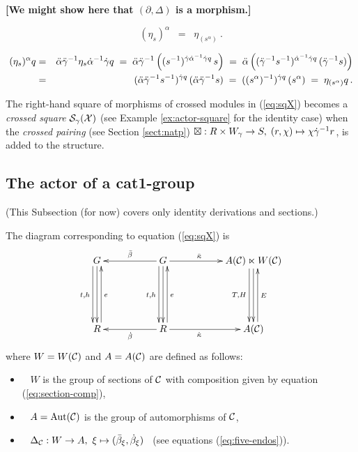 \vspace{3mm}
\noindent
{\bf [We might show here that $(\partial,\Delta)$ is a morphism.]}
\vspace{3mm}

\begin{lem}
$$
(\eta_s)^{\alpha} \;\;=\;\; \eta_{(s^{\alpha})}~.
$$
\end{lem}
\begin{pf} 
\begin{eqnarray*}
(\eta_s)^{\alpha}q 
  & = &  \ddot{\alpha} \ddot{\gamma}^{-1} \eta_s \dot{\alpha}^{-1} \dot{\gamma} q  
  \;=\;  \ddot{\alpha} \ddot{\gamma}^{-1} 
           \left( (s^{-1})^{\dot{\gamma}\dot{\alpha}^{-1}\dot{\gamma} q}\,s \right) 
  \;=\;  \ddot{\alpha}\left( (\ddot{\gamma}^{-1}s^{-1})^{\dot{\alpha}^{-1}\dot{\gamma} q}\,(\ddot{\gamma}^{-1}s)\right) \\ 
  & = &  (\ddot{\alpha} \ddot{\gamma}^{-1} s^{-1})^{\dot{\gamma} q}\,(\ddot{\alpha} \ddot{\gamma}^{-1}s)  
  \;=\;  ((s^{\alpha})^{-1})^{\dot{\gamma} q}\,(s^{\alpha}) 
  \;=\;  \eta_{(s^{\alpha})}q \,. 
\end{eqnarray*}
\end{pf}

\bigskip 
The right-hand square of morphisms of crossed modules in (\ref{eq:sqX})
becomes a \emph{crossed square} $\mathcal{S}_{\gamma}(\mathcal{X})$ 
(see Example \ref{ex:actor-square} for the identity case) 
when the \emph{crossed pairing} (see Section \ref{sect:natp}) 
$\boxtimes : R \times W_{\gamma} \to S,\; (r,\chi) \mapsto \chi \dot{\gamma}^{-1} r$, 
is added to the structure. 



\subsection{The actor of a cat1-group} \label{subs:AC}

(This Subsection (for now) covers only identity derivations and sections.) 

\medskip\noindent
The diagram corresponding to equation (\ref{eq:sqX}) is
\begin{equation} \label{eq:sqC}
\vcenter{\xymatrix{
  G \ar[dd]  \ar[dd] <-1.0ex>_{t,h}
    &&  G \ar[ll]_{\barb}  \ar[rr]^(0.4){\ddk}
          \ar[dd]  \ar[dd] <-1.0ex>_{t,h}
       &&  A(\calC) \ltimes W(\calC)  
            \ar[dd]  \ar[dd] <-1.0ex>_{T,H}  \\
    && &&   \\
  R \ar[uu] <-1.0ex>_e 
    &&  R \ar[uu] <-1.0ex>_e \ar[ll]^{\db} \ar[rr]_(0.4){\dk}
       &&  A(\calC) \ar[uu] <-1.0ex>_{E} \\
}} 
\end{equation}
where $W = W(\mathcal{C})$ and $A = A(\mathcal{C})$ are defined as follows:
\begin{itemize}
\item~
$W$ is the group of sections of $\mathcal{C}$
with composition given by equation (\ref{eq:section-comp}),
\item~
$A=\mathrm{Aut}(\mathcal{C})$ is the group of automorphisms of $\mathcal{C}$,
\item~
$\Delta_{\mathcal{C}} : W \to A,~
\xi \mapsto (\bar{\beta}_{\xi}, \dot{\beta}_{\xi})$~
(see equations (\ref{eq:five-endos})).
\end{itemize}

